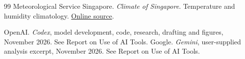 \begin{thebibliography}{99}
Meteorological Service Singapore. \emph{Climate of Singapore}. Temperature and humidity climatology.
\href{https://www.weather.gov.sg/climate-climate-of-singapore}{Online source}. 


\ifinlineai
{} OpenAI. \emph{Codex}, model development, code, research, drafting and figures, November 2026. See Report on Use of AI Tools.
 Google. \emph{Gemini}, user-supplied analysis excerpt, November 2026. See Report on Use of AI Tools.
\fi
\end{thebibliography}
